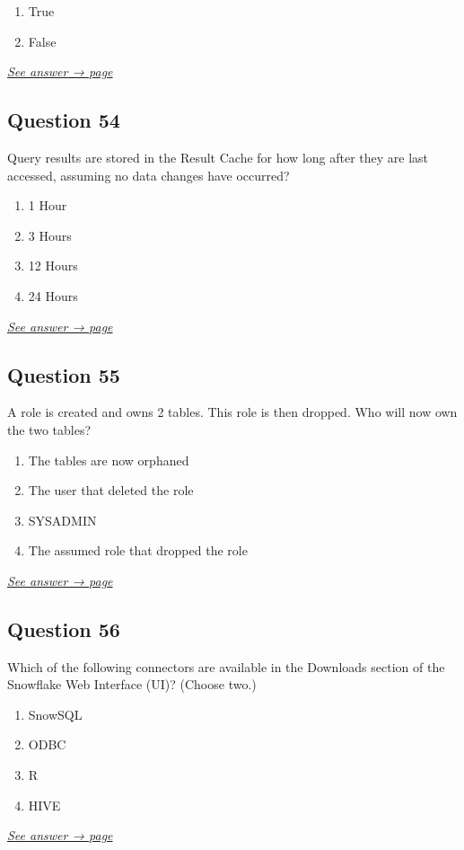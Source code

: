 \documentclass[12pt]{article}
\newcommand{\seeanswer}[1]{%
  \par\smallskip\emph{\hyperref[ans:#1]{See answer → page \pageref{ans:#1}}}%
}
\begin{document}
\begin{enumerate}[label=\Alph*.]
  \item True
  \item False
\end{enumerate}
\seeanswer{53}

\subsection*{Question 54}\label{q:54}
Query results are stored in the Result Cache for how long after they are last accessed, assuming no data changes have occurred?

\begin{enumerate}[label=\Alph*.]
  \item 1 Hour
  \item 3 Hours
  \item 12 Hours
  \item 24 Hours
\end{enumerate}
\seeanswer{54}

\subsection*{Question 55}\label{q:55}
A role is created and owns 2 tables. This role is then dropped. Who will now own the two tables?

\begin{enumerate}[label=\Alph*.]
  \item The tables are now orphaned
  \item The user that deleted the role
  \item SYSADMIN
  \item The assumed role that dropped the role
\end{enumerate}
\seeanswer{55}

\subsection*{Question 56}\label{q:56}
Which of the following connectors are available in the Downloads section of the Snowflake Web Interface (UI)? (Choose two.)

\begin{enumerate}[label=\Alph*.]
  \item SnowSQL
  \item ODBC
  \item R
  \item HIVE
\end{enumerate}
\seeanswer{56}
\end{document}

